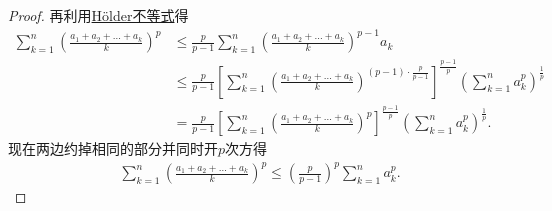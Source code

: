 \documentclass[../../main.tex]{subfiles}
\begin{document}
\begin{proof}
再利用\hyperref[theorem:Hold不等式]{Hölder不等式}得
\begin{align*}
\sum_{k=1}^n{\left( \frac{a_1+a_2+\dots +a_k}{k} \right) ^p}&\leqslant \frac{p}{p-1}\sum_{k=1}^n{\left( \frac{a_1+a_2+\dots +a_k}{k} \right) ^{p-1}a_k}\\
&\leqslant \frac{p}{p-1}\left[ \sum_{k=1}^n{\left( \frac{a_1+a_2+\dots +a_k}{k} \right) ^{\left( p-1 \right) \cdot \frac{p}{p-1}}} \right] ^{\frac{p-1}{p}}\left( \sum_{k=1}^n{a_{k}^{p}} \right) ^{\frac{1}{p}}
\\
&=\frac{p}{p-1}\left[ \sum_{k=1}^n{\left( \frac{a_1+a_2+\dots +a_k}{k} \right) ^p} \right] ^{\frac{p-1}{p}}\left( \sum_{k=1}^n{a_{k}^{p}} \right) ^{\frac{1}{p}}.
\end{align*}
现在两边约掉相同的部分并同时开$p$次方得
\begin{align*}
\sum_{k=1}^n{\left( \frac{a_1+a_2+\dots +a_k}{k} \right) ^p}\leqslant \left( \frac{p}{p-1} \right) ^p\sum_{k=1}^n{a_{k}^{p}}.
\end{align*}

\end{proof}
\end{document}
